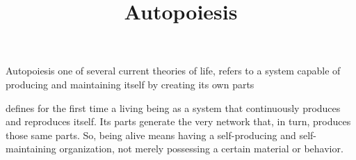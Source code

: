 \documentclass[a4paper]{article}
\title{Autopoiesis}
\date{}
\begin{document}
    \maketitle
    
    Autopoiesis one of several current theories of life, refers to a system capable of producing and maintaining itself by creating its own parts
    
    \cite{maturana-varela-1980-autopoiesis-and-cognition-the-realization-of-the-living}
    defines for the first time a living being as a system that continuously produces and reproduces itself. Its parts generate the very network that, in turn, produces those same parts.
    So, being alive means having a self-producing and self-maintaining organization, not merely possessing a certain material or behavior.
    
    
    
    
    
\end{document}

